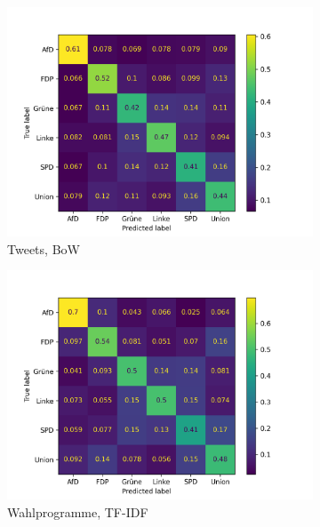 \begin{figure}[H]
\centering
\begin{subfigure}{0.49\textwidth}
    \includegraphics[width=\textwidth]{data/images/modeling/mlp/under/tweets_confusion_matrix.png}
    \caption{Tweets, \ac{BoW}}
    \label{sfig:confusionMatrixMlpTweets}
\end{subfigure}
\hfill
\begin{subfigure}{0.49\textwidth}
    \includegraphics[width=\textwidth]{data/images/modeling/mlp/under/party_programs_confusion_matrix.png}
    \caption{Wahlprogramme, \ac{TF-IDF}}
    \label{sfig:confusionMatrixMlpManifest}
\end{subfigure}
\hfill
\begin{subfigure}{0.49\textwidth}

\end{subfigure}
\end{figure}
